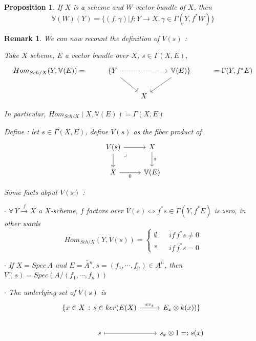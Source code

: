 \documentclass{article}
\newtheorem{proposition}[theorem]{Proposition}
\newtheorem{remark}[theorem]{Remark}
\begin{document}
\begin{proposition}
    If $X$ is a scheme and $W$ vector bundle of $X$, then
    $$
    \mathbb V(W)(Y)=\{(f,\gamma)|f:Y\to X,\gamma\in\Gamma(Y,f^\ast W)\}
    $$
\end{proposition}

\begin{remark}
    We can now recount the definition of $V(s)$ :

    Take $X$ scheme, $E$ a vector bundle over $X$, $s\in\Gamma(X,E)$, 
    \[\begin{tikzcd}
	{Hom_{Sch/X}(Y,\mathbb V(E))=} & {\{Y} && {\mathbb V(E)\}} & {=\Gamma(Y,f^\ast E)} \\
	&& X
	\arrow[from=1-2, to=2-3]
	\arrow[dotted, from=1-2, to=1-4]
	\arrow[from=1-4, to=2-3]
\end{tikzcd}\]

In particular, $Hom_{Sch/X}(X,\mathbb V(E))=\Gamma(X, E)$

Define : let $s\in \Gamma(X, E)$, define $V(s)$ as the fiber product of 
\[\begin{tikzcd}
	{V(s)} & X \\
	X & {\mathbb V(E)}
	\arrow["0"', from=2-1, to=2-2]
	\arrow["s", from=1-2, to=2-2]
	\arrow[from=1-1, to=2-1]
	\arrow["\lrcorner"{anchor=center, pos=0.125}, draw=none, from=1-1, to=2-2]
	\arrow[from=1-1, to=1-2]
\end{tikzcd}\]

Some facts abput $V(s)$ :

$\cdot$ $\forall\, Y\xrightarrow{f}X$ a $X$-scheme, $f$ factors over $V(s)\Leftrightarrow f^\ast s\in \Gamma(Y,f^\ast E)$ is zero, in other words 
$$ 
Hom_{Sch/X}(Y,V(s))
=\left\{
\begin{array}{rcl}
\emptyset  &      & if \, f^\ast s\ne0\\
\ast  &  & if \, f^\ast s=0
\end{array} \right.
$$

$\cdot$ If $X=Spec\,A$ and $E=\widetilde {A^n},s=(f_1,\cdots,f_n)\in A^n$, then $V(s)=Spec(A/(f_1,\cdots,f_n))$

$\cdot$ The underlying set of $V(s)$ is 
\[\begin{tikzcd}
	{\{x\in X\,:\, s\in ker(E(X)} & {E_x\otimes k(x))\}} \\
	s & {s_x\otimes1=:s(x)}
	\arrow["{ev_x}", from=1-1, to=1-2]
	\arrow[maps to, from=2-1, to=2-2]
\end{tikzcd}\]
\end{remark}
\end{document}
